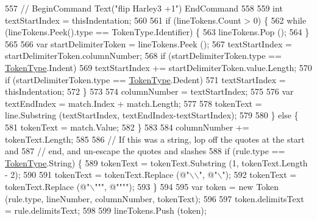 \begin{DoxyCode}
557                         \textcolor{comment}{//    BeginCommand Text("flip Harley3 +1") EndCommand}
558 
559                         \textcolor{keywordtype}{int} textStartIndex = thisIndentation;
560 
561                         \textcolor{keywordflow}{if} (lineTokens.Count > 0) \{
562                             \textcolor{keywordflow}{while} (lineTokens.Peek().type == TokenType.Identifier) \{
563                                 lineTokens.Pop ();
564                             \}
565 
566                             var startDelimiterToken = lineTokens.Peek ();
567                             textStartIndex = startDelimiterToken.columnNumber;
568                             \textcolor{keywordflow}{if} (startDelimiterToken.type == \hyperlink{a00026_a301aa7c866593a5b625a8fc158bbeace}{TokenType}.Indent)
569                                 textStartIndex += startDelimiterToken.value.Length;
570                             \textcolor{keywordflow}{if} (startDelimiterToken.type == \hyperlink{a00026_a301aa7c866593a5b625a8fc158bbeace}{TokenType}.Dedent)
571                                 textStartIndex = thisIndentation;
572                         \}
573 
574                         columnNumber = textStartIndex;
575 
576                         var textEndIndex = match.Index + match.Length;
577 
578                         tokenText = line.Substring (textStartIndex, textEndIndex-textStartIndex);
579 
580                     \} \textcolor{keywordflow}{else} \{
581                         tokenText = match.Value;
582                     \}
583 
584                     columnNumber += tokenText.Length;
585 
586                     \textcolor{comment}{// If this was a string, lop off the quotes at the start and}
587                     \textcolor{comment}{// end, and un-escape the quotes and slashes}
588                     \textcolor{keywordflow}{if} (rule.type == \hyperlink{a00026_a301aa7c866593a5b625a8fc158bbeace}{TokenType}.String) \{
589                         tokenText = tokenText.Substring (1, tokenText.Length - 2);
590 
591                         tokenText = tokenText.Replace (\textcolor{stringliteral}{@"\(\backslash\)\(\backslash\)"}, \textcolor{stringliteral}{@"\(\backslash\)"});
592                         tokenText = tokenText.Replace (\textcolor{stringliteral}{@"\(\backslash\)"""}, \textcolor{stringliteral}{@""""});
593                     \}
594 
595                     var token = \textcolor{keyword}{new} Token (rule.type, lineNumber, columnNumber, tokenText);
596 
597                     token.delimitsText = rule.delimitsText;
598 
599                     lineTokens.Push (token);

\end{DoxyCode}
